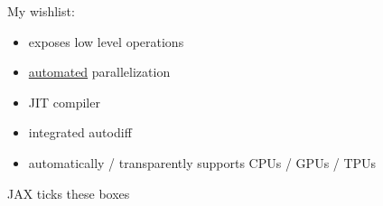 \documentclass[
    xcolor={svgnames,dvipsnames},
    hyperref={colorlinks, citecolor=DeepPink4, linkcolor=DarkRed, urlcolor=DarkBlue}
    ]{beamer}  %
\newcommand{\1}{\mathbbm 1}
\begin{document}
\begin{frame}
    

    My wishlist:

    \begin{itemize}
        \item exposes low level operations 
    \vspace{0.5em}
        \item \underline{automated} parallelization
    \vspace{0.5em}
        \item JIT compiler 
    \vspace{0.5em}
        \item integrated autodiff
    \vspace{0.5em}
        \item automatically / transparently supports CPUs / GPUs / TPUs 
    \end{itemize}

    \vspace{0.5em}
    \vspace{0.5em}
    JAX ticks these boxes



\end{frame}
\end{document}
